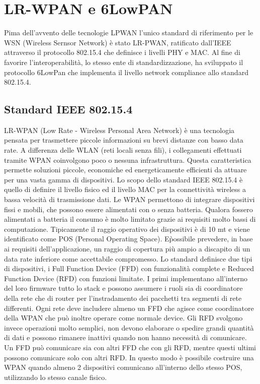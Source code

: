 \documentclass[12pt,a4paper,openright,twoside]{report}
\begin{document}
\chapter{LR-WPAN e 6LowPAN}
Pima dell'avvento delle tecnologie LPWAN l'unico standard di riferimento per le WSN (Wireless Sernsor Network) \`e stato LR-PWAN, ratificato dall'IEEE attraverso il protocollo 802.15.4 che definisce i livelli PHY e MAC. 
Al fine di favorire l'interoperabilit\`a, lo stesso ente di standardizzazione, ha sviluppato il protocollo 6LowPan che implementa il livello network compliance allo standard 802.15.4.

\section{Standard IEEE 802.15.4}
LR-WPAN (Low Rate - Wireless Personal Area Network) \`e una tecnologia pensata per trasmettere piccole informazioni su brevi distanze con basso data rate. 
A differenza delle WLAN (reti locali senza fili), i collegamenti effettuati tramite WPAN coinvolgono poco o nessuna infrastruttura. Questa caratteristica permette soluzioni piccole, economiche ed energeticamente efficienti da attuare per una vasta gamma di dispositivi.
Lo scopo dello standard IEEE 802.15.4 \`e quello di definire il livello fisico ed il livello MAC per la connettivit\`a wireless a bassa velocit\`a di trasmissione dati. 
Le WPAN permettono di integrare dispositivi fissi e mobili, che possono essere alimentati con o senza batteria. Qualora fossero alimentati a batteria il consumo \`e molto limitato grazie ai requisiti molto bassi di computazione. Tipicamente il raggio operativo dei dispositivi \`e di 10 mt e viene identificato come POS (Personal Operating Space). 
E\` possibile prevedere, in base ai requisiti dell'applicazione, un raggio di copertura pi\`u ampio a discapito di un data rate inferiore come accettabile compromesso. 		 	 
Lo standard definisce due tipi di dispositivi, i Full Function Device (FFD) con funzionalit\`a complete e Reduced Function Device (RFD) con funzioni limitate. I primi implementano all'interno del loro firmware tutto lo stack e possono assumere i ruoli sia di coordinatore della rete che di router per l'instradamento dei pacchetti tra segmenti di rete differenti.
Ogni rete deve includere almeno un FFD che agisce come coordinatore della WPAN che pu\`o inoltre operare come normale device. Gli RFD svolgono invece operazioni molto semplici, non devono elaborare o spedire grandi quantit\`a di dati e possono rimanere inattivi quando non hanno necessit\`a di comunicare. Un FFD pu\`o comunicare sia con altri FFD che con gli RFD, mentre questi ultimi possono comunicare solo con altri RFD. In questo modo \`e possibile costruire una WPAN quando almeno 2 dispositivi comunicano all'interno dello stesso POS, utilizzando lo stesso canale fisico. 
\end{document}
